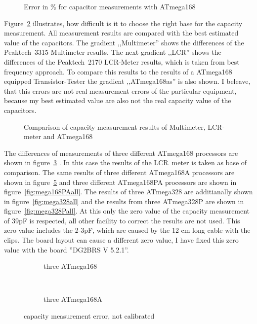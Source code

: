 \begin{figure}[H]
\centering

\caption{Error in \% for capacitor measurements with ATmega168 }
\label{fig:mega168cap}
\end{figure}

Figure~\ref{fig:capcompare} illustrates, how difficult is it to choose the right base for the capacity measurement.
All measurement results are compared with the best estimated value of the capacitors.
The gradient ,,Multimeter'' shows the differences of the Peaktech~3315 Multimeter results.
The next gradient ,,LCR'' shows the differences of the Peaktech~2170 LCR-Meter results, which is taken from best frequency approach.
To compare this results to the results of a ATmega168 equipped Transistor-Tester the gradient ,,ATmega168as'' is also shown.
I beleave, that this errors are not real measurement errors of the particular equipment, because my best estimated value are
also not the real capacity value of the capacitors.

\begin{figure}[H]
\centering

\caption{Comparison of capacity measurement results of Multimeter, LCR-meter and ATmega168}
\label{fig:capcompare}
\end{figure}

The differences of measurements of three different ATmega168 processors are shown in figure~\ref{fig:mega168all} .
In this case the results of the LCR~meter is taken as base of comparison.
The same results of three different ATmega168A processors are shown in figure~\ref{fig:mega168Aall} and
three different ATmega168PA processors are shown in figure~\ref{fig:mega168PAall}.
The results of three ATmega328 are additianally shown in figure~\ref{fig:mega328all} and the results from three
ATmega328P are shown in figure~\ref{fig:mega328Pall}.
At this only the zero value of the capacity measurement of 39pF is respected, all other facility to correct the results are
not used.
This zero value includes the 2-3pF, which are caused by the 12 cm long cable with the clips.
The board layout can cause a different zero value, I have fixed this zero value with the board ''DG2BRS V 5.2.1''.

\begin{figure}[H]
  \begin{subfigure}[b]{9cm}
    \centering
    \resizebox{9cm}{!}{}
    \caption{three ATmega168}
    \label{fig:mega168all}
  \end{subfigure}
  ~
  \begin{subfigure}[b]{9cm}
    \centering
    \resizebox{9cm}{!}{}
    \caption{three ATmega168A}
    \label{fig:mega168Aall}
  \end{subfigure}
\caption{capacity measurement error, not calibrated}
\end{figure}

